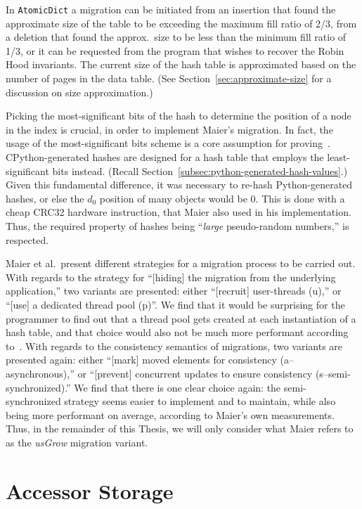 In \texttt{AtomicDict} a migration can be initiated from an insertion that found the approximate size of the table to be exceeding the maximum fill ratio of 2/3, from a deletion that found the approx.\ size to be less than the minimum fill ratio of 1/3, or it can be requested from the program that wishes to recover the Robin Hood invariants.
The current size of the hash table is approximated based on the number of pages in the data table.
(See Section~\ref{sec:approximate-size} for a discussion on size approximation.)

Picking the most-significant bits of the hash to determine the position of a node in the index is crucial, in order to implement Maier's migration.
In fact, the usage of the most-significant bits scheme is a core assumption for proving~\cite[Lemma~5.1]{maier}.
CPython-generated hashes are designed for a hash table that employs the least-significant bits instead.
(Recall Section~\ref{subsec:python-generated-hash-values}.)
Given this fundamental difference, it was necessary to re-hash Python-generated hashes, or else the $d_0$ position of many objects would be $0$.
This is done with a cheap CRC32 hardware instruction, that Maier also used in his implementation.
Thus, the required property of hashes being ``\emph{large} pseudo-random numbers,'' is respected.

Maier et al.\ present different strategies for a migration process to be carried out.
With regards to the strategy for ``[hiding] the migration from the underlying application,'' two variants are presented: either ``[recruit] user-threads (u),'' or ``[use] a dedicated thread pool (p)''.
We find that it would be surprising for the programmer to find out that a thread pool gets created at each instantiation of a hash table, and that choice would also not be much more performant according to~\cite[\S8.4, Using Dedicated Growing Threads]{maier}.
With regards to the consistency semantics of migrations, two variants are presented again: either ``[mark] moved elements for consistency (a--asynchronous),'' or ``[prevent] concurrent updates to ensure consistency (s--semi-synchronized).''
We find that there is one clear choice again: the semi-synchronized strategy seems easier to implement and to maintain, while also being more performant on average, according to Maier's own measurements.
Thus, in the remainder of this Thesis, we will only consider what Maier refers to as the \emph{usGrow} migration variant.


\section{Accessor Storage}\label{sec:accessor-storage}

